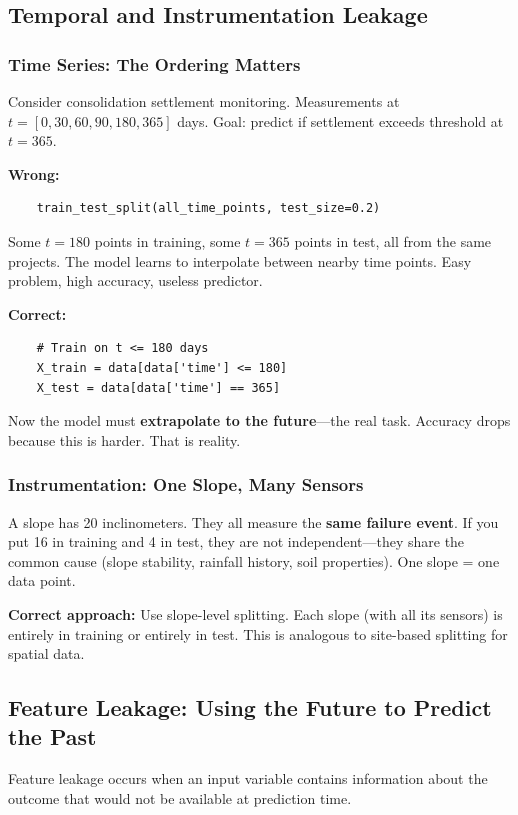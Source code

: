 \documentclass[12pt]{article}
\begin{document}
\subsection{Temporal and Instrumentation Leakage}

\subsubsection{Time Series: The Ordering Matters}

Consider consolidation settlement monitoring. Measurements at $t = [0, 30, 60, 90, 180, 365]$ days. Goal: predict if settlement exceeds threshold at $t=365$.

\textbf{Wrong:}
\begin{lstlisting}
	train_test_split(all_time_points, test_size=0.2)
\end{lstlisting}
Some $t=180$ points in training, some $t=365$ points in test, all from the same projects. The model learns to interpolate between nearby time points. Easy problem, high accuracy, useless predictor.

\textbf{Correct:}
\begin{lstlisting}
	# Train on t <= 180 days
	X_train = data[data['time'] <= 180]
	X_test = data[data['time'] == 365]
\end{lstlisting}
Now the model must \textbf{extrapolate to the future}---the real task. Accuracy drops because this is harder. That is reality.

\subsubsection{Instrumentation: One Slope, Many Sensors}

A slope has 20 inclinometers. They all measure the \textbf{same failure event}. If you put 16 in training and 4 in test, they are not independent---they share the common cause (slope stability, rainfall history, soil properties). One slope = one data point.

\textbf{Correct approach:} Use slope-level splitting. Each slope (with all its sensors) is entirely in training or entirely in test. This is analogous to site-based splitting for spatial data.

\subsection{Feature Leakage: Using the Future to Predict the Past}

Feature leakage occurs when an input variable contains information about the outcome that would not be available at prediction time.
\end{document}
